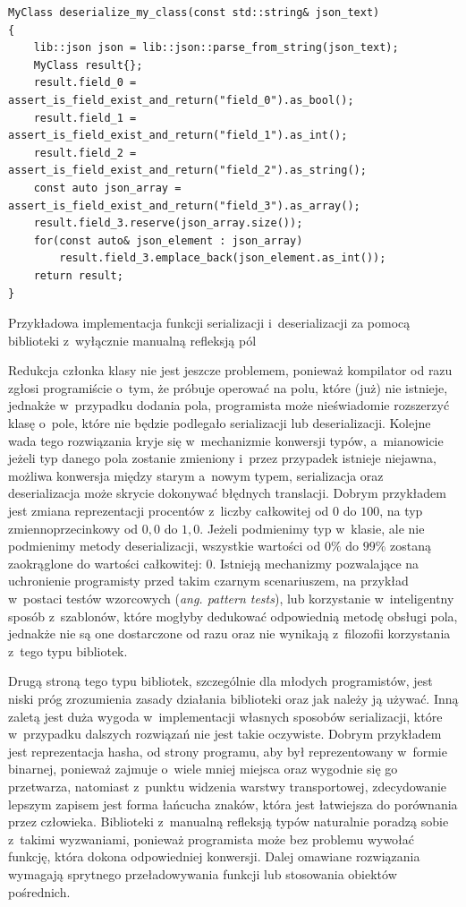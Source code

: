 \documentclass[12pt]{article}
\newcommand{\n}{\newline}
\newcommand{\nonpl}[1]{{\it #1}}
\newcommand{\ang}[1]{\nonpl{ang. #1}}
\begin{document}
{{{\begin{captioned}[H]
\begin{lstlisting}[frame=single]
MyClass deserialize_my_class(const std::string& json_text)
{
	lib::json json = lib::json::parse_from_string(json_text);
	MyClass result{};
	result.field_0 = assert_is_field_exist_and_return("field_0").as_bool();
	result.field_1 = assert_is_field_exist_and_return("field_1").as_int();
	result.field_2 = assert_is_field_exist_and_return("field_2").as_string();
	const auto json_array = assert_is_field_exist_and_return("field_3").as_array();
	result.field_3.reserve(json_array.size());
	for(const auto& json_element : json_array)
		result.field_3.emplace_back(json_element.as_int());
	return result;
}
					\end{lstlisting}
					\caption{ Przykładowa implementacja funkcji serializacji i~deserializacji za pomocą biblioteki z~wyłącznie manualną refleksją pól}
					\label{manual_reflection_example}
				\end{captioned}

				Redukcja członka klasy nie jest jeszcze problemem, ponieważ kompilator od razu zgłosi programiście o~tym, że próbuje operować na polu,
				które (już) nie istnieje, jednakże w~przypadku dodania pola, programista może nieświadomie rozszerzyć klasę o~pole, które nie będzie podlegało serializacji
				lub deserializacji. Kolejne wada tego rozwiązania kryje się w~mechanizmie konwersji typów, a~mianowicie jeżeli typ danego pola zostanie
				zmieniony i~przez przypadek istnieje niejawna, możliwa konwersja między starym a~nowym typem, serializacja oraz deserializacja może
				skrycie dokonywać błędnych translacji. Dobrym przykładem jest zmiana reprezentacji procentów z~liczby całkowitej od $0$ do $100$,
				na typ zmiennoprzecinkowy od $0,0$ do $1,0$. Jeżeli podmienimy typ w~klasie, ale nie podmienimy metody deserializacji, wszystkie wartości
				od $0\%$ do $99\%$ zostaną zaokrąglone do wartości całkowitej: $0$. Istnieją mechanizmy pozwalające na uchronienie programisty przed takim
				czarnym scenariuszem, na przykład w~postaci testów wzorcowych (\ang{pattern tests}), lub korzystanie w~inteligentny sposób z~szablonów,
				które mogłyby dedukować odpowiednią metodę obsługi pola, jednakże nie są one dostarczone od razu oraz nie wynikają z~filozofii
				korzystania z~tego typu bibliotek.\n

				Drugą stroną tego typu bibliotek, szczególnie dla młodych programistów, jest niski próg zrozumienia zasady działania
				biblioteki oraz jak należy ją używać. Inną zaletą jest duża wygoda w~implementacji własnych sposobów serializacji,
				które w~przypadku dalszych rozwiązań nie jest takie oczywiste. Dobrym przykładem jest reprezentacja hasha\cite{hash_po_angielskiemu},
				od strony programu, aby był reprezentowany w~formie binarnej, ponieważ zajmuje o~wiele mniej miejsca oraz wygodnie się go przetwarza,
				natomiast z~punktu widzenia warstwy transportowej, zdecydowanie lepszym zapisem jest forma łańcucha znaków, która jest łatwiejsza do porównania
				przez człowieka. Biblioteki z~manualną refleksją typów naturalnie poradzą sobie z~takimi wyzwaniami, ponieważ programista może bez problemu
				wywołać funkcję, która dokona odpowiedniej konwersji. Dalej omawiane rozwiązania wymagają sprytnego przeładowywania funkcji lub
				stosowania obiektów pośrednich.
			}
		}

}
\end{document}
